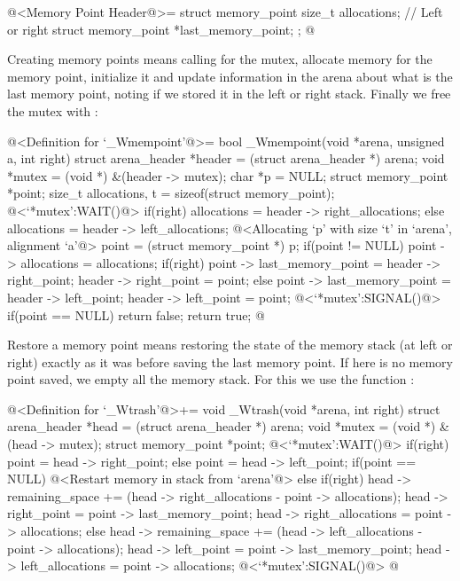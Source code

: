\iniciocodigo
@<Memory Point Header@>=
struct memory_point{
  size_t allocations; // Left or right
  struct memory_point *last_memory_point;
};
@
\fimcodigo


Creating memory points means calling  for the mutex,
allocate memory for the memory point, initialize it and update
information in the arena about what is the last memory point, noting
if we stored it in the left or right stack. Finally we free the mutex
with :

\iniciocodigo
@<Definition for `\_Wmempoint'@>=
bool _Wmempoint(void *arena, unsigned a, int right){
  struct arena_header *header = (struct arena_header *) arena;
  void *mutex = (void *) &(header -> mutex);
  char *p = NULL;
  struct memory_point *point;
  size_t allocations, t = sizeof(struct memory_point);
  @<`*mutex':WAIT()@>
  if(right)
    allocations = header -> right_allocations;
  else
    allocations = header -> left_allocations;
  @<Allocating `p' with size `t' in `arena', alignment `a'@>
  point = (struct memory_point *) p;
  if(point != NULL){
    point -> allocations = allocations;
    if(right){
      point -> last_memory_point = header -> right_point;
      header -> right_point = point;
    }
    else{
      point -> last_memory_point = header -> left_point;
      header -> left_point = point;
    }
  }
  @<`*mutex':SIGNAL()@>
  if(point == NULL)
    return false;
  return true;
}
@
\fimcodigo


Restore a memory point means restoring the state of the memory stack
(at left or right) exactly as it was before saving the last memory
point. If here is no memory point saved, we empty all the memory
stack. For this we use the function :

\iniciocodigo
@<Definition for `\_Wtrash'@>+=
void _Wtrash(void *arena, int right){
  struct arena_header *head = (struct arena_header *) arena;
  void *mutex = (void *) &(head -> mutex);
  struct memory_point *point;
  @<`*mutex':WAIT()@>
  if(right){
    point = head -> right_point;
  }
  else{
    point = head -> left_point;
  }
  if(point == NULL){
    @<Restart memory in stack from `arena'@>
  }
  else{
    if(right){
      head -> remaining_space += (head -> right_allocations -
                                  point -> allocations);
      head -> right_point = point -> last_memory_point;
      head -> right_allocations = point -> allocations;
    }
    else{
      head -> remaining_space += (head -> left_allocations -
                                  point -> allocations);
      head -> left_point = point -> last_memory_point;
      head -> left_allocations = point -> allocations;
    }
  }
  @<`*mutex':SIGNAL()@>
}
@
\fimcodigo


